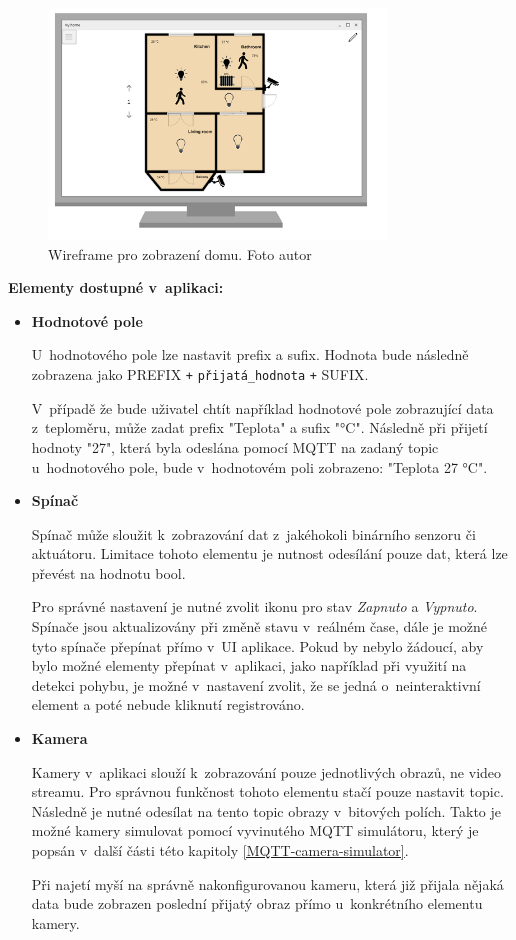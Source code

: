 \begin{figure}[H]
  \centering
  \includegraphics[width=0.8\textwidth]{obrazky-figures/applicationWireframe/firstScreen.png}
  \caption{Wireframe pro zobrazení domu. Foto autor}
  \label{firstScreenWireframe}
\end{figure}

\noindent\textbf{Elementy dostupné v~aplikaci:}
\begin{itemize}
  \item \textbf{Hodnotové pole}
  
  U~hodnotového pole lze nastavit prefix a sufix. Hodnota bude následně zobrazena jako PREFIX \verb|+| \verb|přijatá_hodnota| \verb|+| SUFIX. 
  
  V~případě že bude uživatel chtít například hodnotové pole zobrazující data z~teploměru, může zadat prefix "Teplota" a sufix "°C". Následně při přijetí hodnoty "27", která byla odeslána pomocí MQTT na zadaný topic u~hodnotového pole, bude v~hodnotovém poli zobrazeno: "Teplota 27 °C".

  \item \textbf{Spínač}
  
  Spínač může sloužit k~zobrazování dat z~jakéhokoli binárního senzoru či aktuátoru. Limitace tohoto elementu je nutnost odesílání pouze dat, která lze převést na hodnotu bool.

  Pro správné nastavení je nutné zvolit ikonu pro stav \emph{Zapnuto} a \emph{Vypnuto}. Spínače jsou aktualizovány při změně stavu v~reálném čase, dále je možné tyto spínače přepínat přímo v~UI aplikace. Pokud by nebylo žádoucí, aby bylo možné elementy přepínat v~aplikaci, jako například při využití na detekci pohybu, je možné v~nastavení zvolit, že se jedná o~neinteraktivní element a poté nebude kliknutí registrováno.
  
  \item \textbf{Kamera}
  
  Kamery v~aplikaci slouží k~zobrazování pouze jednotlivých obrazů, ne video streamu. Pro správnou funkčnost tohoto elementu stačí pouze nastavit topic. Následně je nutné odesílat na tento topic obrazy v~bitových polích. Takto je možné kamery simulovat pomocí vyvinutého MQTT simulátoru, který je popsán v~další části této kapitoly \ref{MQTT-camera-simulator}.

  Při najetí myší na správně nakonfigurovanou kameru, která již přijala nějaká data bude zobrazen poslední přijatý obraz přímo u~konkrétního elementu kamery.
  \end{itemize}

